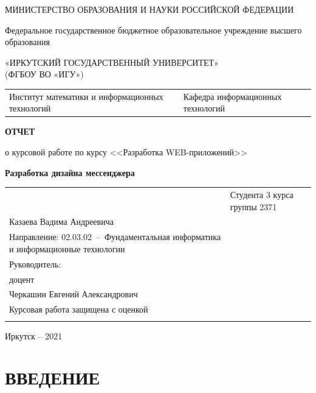 \documentclass[14pt,final]{report}
\begin{document}
\thispagestyle{empty}
\begin{center}
МИНИСТЕРСТВО ОБРАЗОВАНИЯ И НАУКИ РОССИЙСКОЙ ФЕДЕРАЦИИ

Федеральное государственное бюджетное образовательное учреждение высшего образования

«ИРКУТСКИЙ  ГОСУДАРСТВЕННЫЙ УНИВЕРСИТЕТ»\\
(ФГБОУ ВО «ИГУ»)
\end{center}
\vfill %

\noindent\begin{tabularx}{\textwidth} {
  >{\raggedright\arraybackslash}X
  >{\raggedright\arraybackslash}X }
Институт математики и информационных технологий
&
Кафедра информационных технологий
\end{tabularx}

\vfill
\begin{center}
  \textbf{ОТЧЕТ}
\vspace{1em}

о курсовой работе по курсу <<Разработка WEB-приложений>>

{\bf Разработка дизайна мессенджера}

\end{center}
\vfill

\noindent\begin{tabularx}{\textwidth} {
  >{\raggedright\arraybackslash}X
  >{\raggedright}X }
&

Студента 3 курса группы 2371\\
Казаева Вадима Андреевича\\
Направление\;: 02.03.02~--~Фундаментальная информатика и информационные технологии\\[2em]

Руководитель:\\
доцент\\
Черкашин Евгений Александрович\\[2em]

Курсовая работа защищена с оценкой\\[1em] \underline{\hspace{3cm}}
\end{tabularx}
\vfill
\begin{center}
  Иркутск -- 2021
\end{center}
\clearpage

\tableofcontents

\chapter*{ВВЕДЕНИЕ}
\label{chap:intro}
\end{document}
